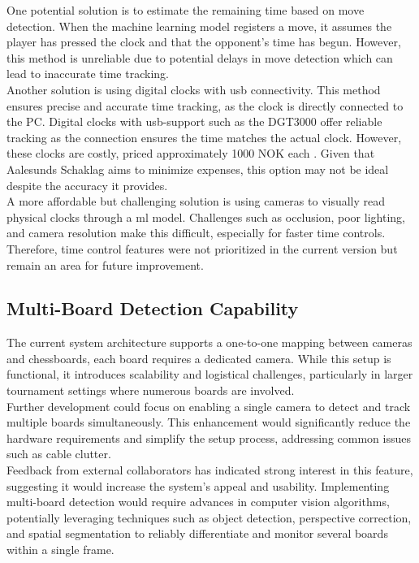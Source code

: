 One potential solution is to estimate the remaining time based on move detection. When the machine learning model registers a move, it assumes the player has pressed the clock and that the opponent’s time has begun. However, this method is unreliable due to potential delays in move detection which can lead to inaccurate time tracking. \\

Another solution is using digital clocks with \gls{usb} connectivity. This method ensures precise and accurate time tracking, as the clock is directly connected to the PC. Digital clocks with \gls{usb}-support such as the DGT3000 offer reliable tracking as the connection ensures the time matches the actual clock. However, these clocks are costly, priced approximately 1000 NOK each \cite{sjakkbutikken:dgt-clock}. Given that Aalesunds Schaklag aims to minimize expenses, this option may not be ideal despite the accuracy it provides. \\

A more affordable but challenging solution is using cameras to visually read physical clocks through a \gls{ml} model. Challenges such as occlusion, poor lighting, and camera resolution make this difficult, especially for faster time controls. \\

Therefore, time control features were not prioritized in the current version but remain an area for future improvement.

\subsection{Multi-Board Detection Capability}
The current system architecture supports a one-to-one mapping between cameras and chessboards, each board requires a dedicated camera. While this setup is functional, it introduces scalability and logistical challenges, particularly in larger tournament settings where numerous boards are involved. \\

Further development could focus on enabling a single camera to detect and track multiple boards simultaneously. This enhancement would significantly reduce the hardware requirements and simplify the setup process, addressing common issues such as cable clutter. \\

Feedback from external collaborators has indicated strong interest in this feature, suggesting it would increase the system's appeal and usability. Implementing multi-board detection would require advances in computer vision algorithms, potentially leveraging techniques such as object detection, perspective correction, and spatial segmentation to reliably differentiate and monitor several boards within a single frame.

